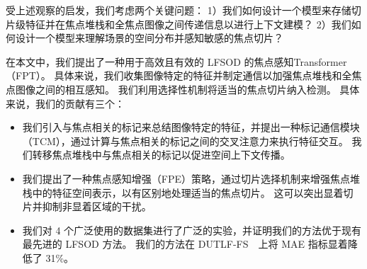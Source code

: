 受上述观察的启发，我们考虑两个关键问题：
%
%
%
%
1）我们如何设计一个模型来存储切片级特征并在焦点堆栈和全焦点图像之间传递信息以进行上下文建模？ 
2）我们如何设计一个模型来理解场景的空间分布并感知敏感的焦点切片？ 
%
%
%
%
\par
在本文中，我们提出了一种用于高效且有效的 LFSOD 的焦点感知Transformer（FPT）。 具体来说，我们收集图像特定的特征并制定通信以加强焦点堆栈和全焦点图像之间的相互感知。 我们利用选择性机制将适当的焦点切片纳入检测。 具体来说，我们的贡献有三个：
%
%
%
%
\par
%
%
%
%
\begin{itemize}
	\item 我们引入与焦点相关的标记来总结图像特定的特征，并提出一种标记通信模块（TCM），通过计算与焦点相关的标记之间的交叉注意力来执行特征交互。 我们转移焦点堆栈中与焦点相关的标记以促进空间上下文传播。 
	
	\item 我们提出了一种焦点感知增强（FPE）策略，通过切片选择机制来增强焦点堆栈中的特征空间表示，以有区别地处理适当的焦点切片。	这可以突出显着切片并抑制非显着区域的干扰。 
	
	\item 我们对 4 个广泛使用的数据集进行了广泛的实验，并证明我们的方法优于现有最先进的 LFSOD 方法。 我们的方法在 DUTLF-FS~\cite{zhang2019memory}~上将 MAE 指标显着降低了 31\%。
\end{itemize}


